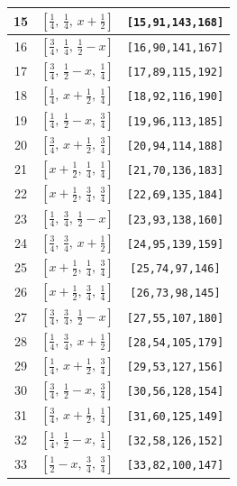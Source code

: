\documentclass[fleqn,8pt]{jsarticle}
\begin{document}
\begin{longtable}{ccc}
15 & $\left[ \frac{1}{4},\, \frac{1}{4},\, x + \frac{1}{2} \right]$ & {\tt [15,91,143,168]} \\ \hline
16 & $\left[ \frac{3}{4},\, \frac{1}{4},\, \frac{1}{2} - x \right]$ & {\tt [16,90,141,167]} \\ \hline
17 & $\left[ \frac{3}{4},\, \frac{1}{2} - x,\, \frac{1}{4} \right]$ & {\tt [17,89,115,192]} \\ \hline
18 & $\left[ \frac{1}{4},\, x + \frac{1}{2},\, \frac{1}{4} \right]$ & {\tt [18,92,116,190]} \\ \hline
19 & $\left[ \frac{1}{4},\, \frac{1}{2} - x,\, \frac{3}{4} \right]$ & {\tt [19,96,113,185]} \\ \hline
20 & $\left[ \frac{3}{4},\, x + \frac{1}{2},\, \frac{3}{4} \right]$ & {\tt [20,94,114,188]} \\ \hline
21 & $\left[ x + \frac{1}{2},\, \frac{1}{4},\, \frac{1}{4} \right]$ & {\tt [21,70,136,183]} \\ \hline
22 & $\left[ x + \frac{1}{2},\, \frac{3}{4},\, \frac{3}{4} \right]$ & {\tt [22,69,135,184]} \\ \hline
23 & $\left[ \frac{1}{4},\, \frac{3}{4},\, \frac{1}{2} - x \right]$ & {\tt [23,93,138,160]} \\ \hline
24 & $\left[ \frac{3}{4},\, \frac{3}{4},\, x + \frac{1}{2} \right]$ & {\tt [24,95,139,159]} \\ \hline
25 & $\left[ x + \frac{1}{2},\, \frac{1}{4},\, \frac{3}{4} \right]$ & {\tt [25,74,97,146]} \\ \hline
26 & $\left[ x + \frac{1}{2},\, \frac{3}{4},\, \frac{1}{4} \right]$ & {\tt [26,73,98,145]} \\ \hline
27 & $\left[ \frac{3}{4},\, \frac{3}{4},\, \frac{1}{2} - x \right]$ & {\tt [27,55,107,180]} \\ \hline
28 & $\left[ \frac{1}{4},\, \frac{3}{4},\, x + \frac{1}{2} \right]$ & {\tt [28,54,105,179]} \\ \hline
29 & $\left[ \frac{1}{4},\, x + \frac{1}{2},\, \frac{3}{4} \right]$ & {\tt [29,53,127,156]} \\ \hline
30 & $\left[ \frac{3}{4},\, \frac{1}{2} - x,\, \frac{3}{4} \right]$ & {\tt [30,56,128,154]} \\ \hline
31 & $\left[ \frac{3}{4},\, x + \frac{1}{2},\, \frac{1}{4} \right]$ & {\tt [31,60,125,149]} \\ \hline
32 & $\left[ \frac{1}{4},\, \frac{1}{2} - x,\, \frac{1}{4} \right]$ & {\tt [32,58,126,152]} \\ \hline
33 & $\left[ \frac{1}{2} - x,\, \frac{3}{4},\, \frac{3}{4} \right]$ & {\tt [33,82,100,147]} \\ \hline

\end{longtable}
\end{document}
